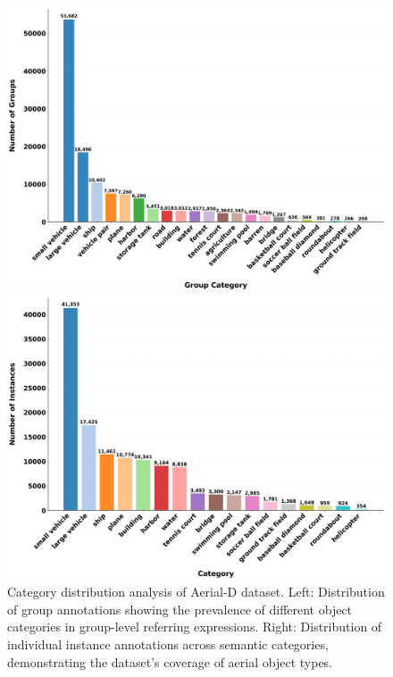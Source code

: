 \begin{figure}[t]
\centering
\begin{minipage}{0.48\textwidth}
\centering
\includegraphics[width=\textwidth]{./images/group_category_distribution.png}
\end{minipage}\hfill
\begin{minipage}{0.48\textwidth}
\centering
\includegraphics[width=\textwidth]{./images/instance_category_distribution.png}
\end{minipage}
\caption{Category distribution analysis of Aerial-D dataset. Left: Distribution of group annotations showing the prevalence of different object categories in group-level referring expressions. Right: Distribution of individual instance annotations across semantic categories, demonstrating the dataset's coverage of aerial object types.}
\label{fig:category_distributions}
\end{figure}


